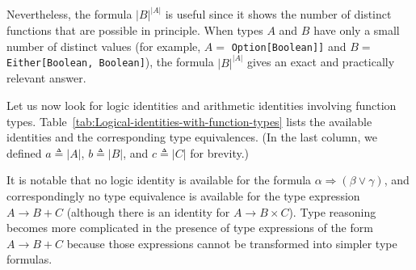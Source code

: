Nevertheless, the formula $\left|B\right|^{\left|A\right|}$ is useful
since it shows the number of distinct functions that are possible
in principle. When types $A$ and $B$ have only a small number of
distinct values (for example, $A=$ \lstinline!Option[Boolean]]!
and $B=$ \lstinline!Either[Boolean, Boolean]!), the formula $\left|B\right|^{\left|A\right|}$
gives an exact and practically relevant answer.

Let us now look for logic identities and arithmetic identities involving
function types. Table~\ref{tab:Logical-identities-with-function-types}
lists the available identities and the corresponding type equivalences.
(In the last column, we defined $a\triangleq\left|A\right|$, $b\triangleq\left|B\right|$,
and $c\triangleq\left|C\right|$ for brevity.) 

It is notable that no logic identity is available for the formula
$\alpha\Rightarrow\left(\beta\vee\gamma\right)$, and correspondingly
no type equivalence is available for the type expression $A\rightarrow B+C$
(although there is an identity for $A\rightarrow B\times C$). Type
reasoning becomes more complicated in the presence of type expressions
of the form $A\rightarrow B+C$ because those expressions cannot be
transformed into simpler type formulas.

